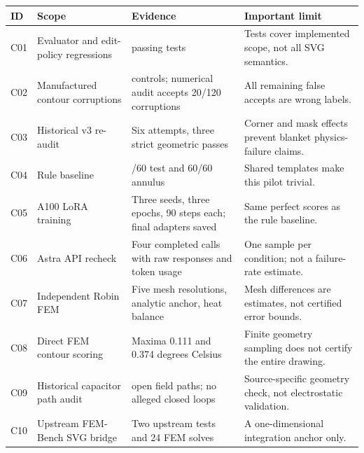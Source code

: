\documentclass[
  11pt,
  a4paper,
]{article}
\newcounter{none} %
\begin{document}
{\def\LTcaptype{none} %
\begin{longtable}[]{@{}
  >{\raggedright\arraybackslash}p{}
  >{\raggedright\arraybackslash}p{}
  >{\raggedright\arraybackslash}p{}
  >{\raggedright\arraybackslash}p{}@{}}
\toprule\noalign{}
\begin{minipage}[b]{\linewidth}\raggedright
ID
\end{minipage} & \begin{minipage}[b]{\linewidth}\raggedright
Scope
\end{minipage} & \begin{minipage}[b]{\linewidth}\raggedright
Evidence
\end{minipage} & \begin{minipage}[b]{\linewidth}\raggedright
Important limit
\end{minipage} \\
\midrule\noalign{}
\endhead
\bottomrule\noalign{}
\endlastfoot
C01 & Evaluator and edit-policy regressions & 30 passing tests & Tests
cover implemented scope, not all SVG semantics. \\
C02 & Manufactured contour corruptions & 160 controls; numerical audit
accepts 20/120 corruptions & All remaining false accepts are wrong
labels. \\
C03 & Historical v3 re-audit & Six attempts, three strict geometric
passes & Corner and mask effects prevent blanket physics-failure
claims. \\
C04 & Rule baseline & 60/60 test and 60/60 annulus & Shared templates
make this pilot trivial. \\
C05 & A100 LoRA training & Three seeds, three epochs, 90 steps each;
final adapters saved & Same perfect scores as the rule baseline. \\
C06 & Astra API recheck & Four completed calls with raw responses and
token usage & One sample per condition; not a failure-rate estimate. \\
C07 & Independent Robin FEM & Five mesh resolutions, analytic anchor,
heat balance & Mesh differences are estimates, not certified error
bounds. \\
C08 & Direct FEM contour scoring & Maxima 0.111 and 0.374 degrees
Celsius & Finite geometry sampling does not certify the entire
drawing. \\
C09 & Historical capacitor path audit & 12 open field paths; no alleged
closed loops & Source-specific geometry check, not electrostatic
validation. \\
C10 & Upstream FEM-Bench SVG bridge & Two upstream tests and 24 FEM
solves & A one-dimensional integration anchor only. \\
\end{longtable}
}
\end{document}
